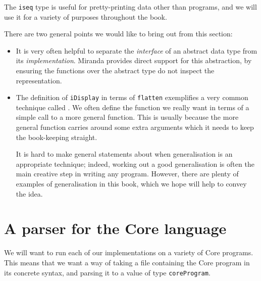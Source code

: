 The \mbox{\tt iseq} type is useful for pretty-printing data other than programs,
and we will use it for a variety of purposes throughout the book.

There are two general points we would like to bring out from this
section:
\begin{itemize}
\item
It is very often helpful to separate the
{\em interface\/} of an abstract data type from its {\em implementation}.
Miranda provides direct support for this abstraction,
by ensuring the functions over the abstract type do not inspect the
representation.
\item
The definition of \mbox{\tt iDisplay} in terms of \mbox{\tt flatten} exemplifies a very common
technique called .
We often define the function we really want in terms of
a simple call to
a more general function.  This is usually because the more general function
carries around some extra arguments which it needs to keep the book-keeping
straight.

It is hard to make general statements about when generalisation
is an appropriate
technique; indeed, working out a good generalisation is often the
main creative step in writing any program.
However, there are plenty of examples of generalisation in this book,
which we hope will help to convey the idea.
\end{itemize}


\section{A parser for the Core language}
\label{sect:parser} 

We will want to run each of our implementations on a variety of Core
programs.  This means that we want a way of taking a file containing
the Core program in its concrete syntax, and parsing it to a value of
type \mbox{\tt coreProgram}.

